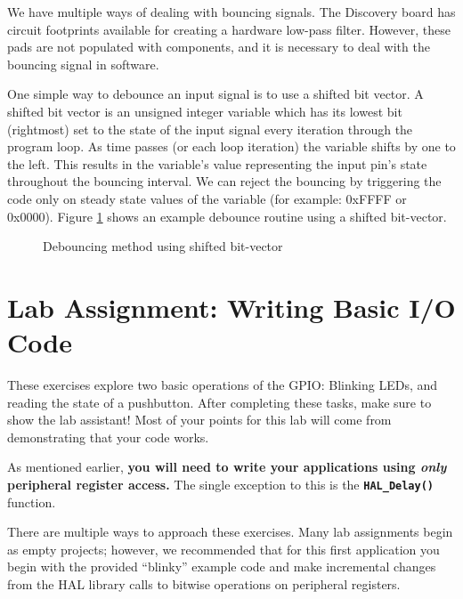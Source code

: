 \documentclass[openany,11pt,fleqn]{book} %
\newcommand{\code}[3]{
    \begin{figure}[]
        \begin{center}
            \hspace*{-3.4cm}
            \colorbox{gray!20!white}{
                \parbox{0.8\paperwidth} {
                    
                }
            }
            \caption{#2}
            \label{#3}
        \end{center}
    \end{figure}
}
\begin{document}
We have multiple ways of dealing with bouncing signals. The Discovery board has circuit footprints available for creating a hardware low-pass filter. However, these pads are not populated with components, and it is necessary to deal with the bouncing signal in software.

One simple way to debounce an input signal is to use a shifted bit vector. A shifted bit vector is an unsigned integer variable which has its lowest bit (rightmost) set to the state of the input signal every iteration through the program loop. As time passes (or each loop iteration) the variable shifts by one to the left. This results in the variable's value representing the input pin's state throughout the bouncing interval. We can reject the bouncing by triggering the code only on steady state values of the variable (for example: 0xFFFF or 0x0000). Figure \ref{debounce} shows an example debounce routine using a shifted bit-vector.

\code{./files/debounce.c}{Debouncing method using shifted bit-vector}{debounce}

\section{\color{blue}Lab Assignment: Writing Basic I/O Code}

These exercises explore two basic operations of the GPIO: Blinking LEDs, and reading the state of a pushbutton.
After completing these tasks, make sure to show the lab assistant! Most of your points for this lab will come from demonstrating that your code works. 
\begin{warning}
As mentioned earlier, \textbf{you will need to write your applications using \textit{only} peripheral register access.} The single exception to this is the \texttt{\textbf{HAL\_Delay()}} function.
\end{warning}

There are multiple ways to approach these exercises. Many lab assignments begin as empty projects; however, we recommended that for this first application you begin with the provided ``blinky'' example code and make incremental changes from the HAL library calls to bitwise operations on peripheral registers.
\end{document}
